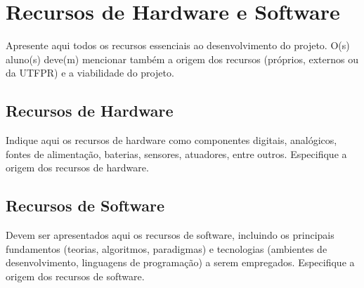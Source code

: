 \chapter{Recursos de Hardware e Software}\label{cap:recursos}

Apresente aqui todos os recursos essenciais ao desenvolvimento do projeto. O(s) aluno(s) deve(m) mencionar também a origem dos recursos (próprios, externos ou da UTFPR) e a viabilidade do projeto.

\section{Recursos de Hardware}\label{s:hardware}

Indique aqui os recursos de hardware como componentes digitais, analógicos, fontes de alimentação, baterias, sensores, atuadores, entre outros. Especifique a origem dos recursos de hardware.

\section{Recursos de Software}\label{s:software}

Devem ser apresentados aqui os recursos de software, incluindo os principais fundamentos (teorias, algoritmos, paradigmas) e tecnologias (ambientes de desenvolvimento, linguagens de programação) a serem empregados. Especifique a origem dos recursos de software.